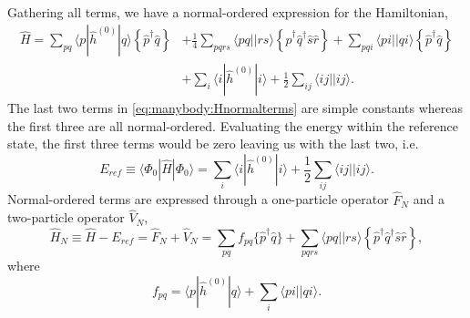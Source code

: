 \paragraph*{}
Gathering all terms, we have a normal-ordered expression for the Hamiltonian,
\begin{equation}
\label{eq:manybody:Hnormalterms}
\begin{split}
\hat{H} 
=
\sum_{pq} \langle p|\hat{h}^{(0)} | q\rangle 
\left\lbrace \hat{p}^{\dagger} \hat{q} \right\rbrace
&+
\frac{1}{4} \sum_{pqrs} \langle pq || rs \rangle \left\lbrace
 \hat{p}^{\dagger} \hat{q}^{\dagger} \hat{s} \hat{r} \right\rbrace
+
\sum_{pqi} \langle pi || qi \rangle 
 \left\lbrace \hat{p}^{\dagger} \hat{q} \right\rbrace  \\
&+
\sum_i \langle i | \hat{h}^{(0)} | i \rangle
+
\frac{1}{2} \sum_{ij} \langle ij || ij \rangle .
\end{split}
\end{equation}
The last two terms in \eqref{eq:manybody:Hnormalterms} are simple constants whereas the first three are all normal-ordered.
Evaluating the energy within the reference state, the first three terms would be zero leaving us with the last two, i.e.
\begin{equation}
E_{ref} \equiv \langle \Phi_0 | \hat{H} | \Phi_0 \rangle 
= 
\sum_i \langle i | \hat{h}^{(0)} | i \rangle
+
\frac{1}{2} \sum_{ij} \langle ij || ij \rangle .
\end{equation}
Normal-ordered terms are expressed through a one-particle operator $\hat{F}_N$ and a two-particle operator $\hat{V}_N$,
\begin{equation}
\label{eq:manybody:normhamil}
\hat{H}_N \equiv \hat{H} - E_{ref} 
=
\hat{F}_N + \hat{V}_N
= 
\sum_{pq} f_{pq} \lbrace \hat{p}^{\dagger} \hat{q} \rbrace
+
\sum_{pqrs} \langle pq||rs \rangle 
\left\lbrace \hat{p}^{\dagger} \hat{q}^{\dagger} \hat{s} \hat{r} \right\rbrace ,
\end{equation}
where 
\begin{equation}
\label{eq:manybody:f_elem}
f_{pq} = \langle p | \hat{h}^{(0)} | q \rangle + \sum_i \langle pi||qi \rangle .
\end{equation}







